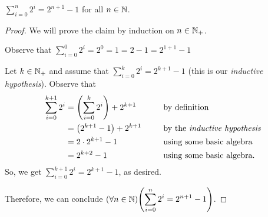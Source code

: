 \begin{theorem}
    $\displaystyle \sum_{i = 0}^{n}2^i = 2^{n + 1} - 1$ for all $n \in \mathbb{N}$.
\end{theorem}
\begin{proof}
    We will prove the claim by induction on $n \in \mathbb{N}_+$.
    \begin{case}
        Observe that $\displaystyle \sum_{i = 0}^{0}2^i = 2^0 = 1 = 2 - 1 = 2^{1 + 1} - 1$
    \end{case}
    \begin{case}
        Let $k \in \mathbb{N}_+$ and assume that $\displaystyle \sum_{i = 0}^{k}2^i = 2^{k + 1} - 1$
        (this is our \emph{inductive hypothesis}).
        Observe that
        \begin{alignat*}{2}
            \sum_{i = 0}^{k + 1}2^i &= \pn*{\sum_{i = 0}^{k}2^i} + 2^{k + 1} &&\text{ by definition} \\
                                    &= \pn*{2^{k + 1} - 1} + 2^{k + 1}~~~~&&\text{ by the \emph{inductive hypothesis}} \\
                                    &= 2 \cdot 2^{k + 1} - 1 &&\text{ using some basic algebra} \\
                                    &= 2^{k + 2} - 1 &&\text{ using some basic algebra}.
        \end{alignat*}
        So, we get $\displaystyle \sum_{i = 0}^{k + 1}2^i = 2^{k + 1} - 1$, as desired.
    \end{case}
    Therefore, we can conclude $\displaystyle \pn*{\forall n \in \N}\pn*{\sum_{i = 0}^{n}2^i = 2^{n + 1} - 1}$.
\end{proof}


